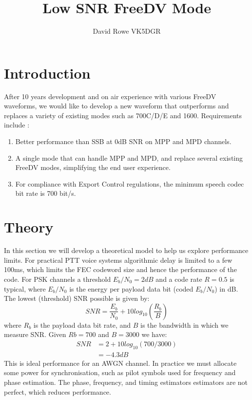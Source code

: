 \documentclass{article}
\begin{document}
\title{Low SNR FreeDV Mode}
\author{David Rowe VK5DGR}
\maketitle

\section{Introduction}

After 10 years development and on air experience with various FreeDV waveforms, we would like to develop a new waveform that outperforms and replaces a variety of existing modes such as 700C/D/E and 1600.  Requirements include \cite{freedv-020}:
\begin{enumerate}
\item Better performance than SSB at 0dB SNR on MPP and MPD channels.
\item A single mode that can handle MPP and MPD, and replace several existing FreeDV modes, simplifying the end user experience.
\item For compliance with Export Control regulations, the minimum speech codec bit rate is 700 bit/s.
\end{enumerate}

\section{Theory}

In this section we will develop a theoretical model to help us explore performance limits.  For practical PTT voice systems algorithmic delay is limited to a few 100ms, which limits the FEC codeword size and hence the performance of the code.  For PSK channels a threshold $E_b/N_0=2dB$ and a code rate $R=0.5$ is typical, where $E_b/N_0$ is the energy per payload data bit (coded $E_b/N_0$) in dB.  The lowest (threshold) SNR possible is given by:
\begin{equation}
SNR = \frac{E_b}{N_0} + 10log_{10}\left(\frac{R_b}{B}\right)
\end{equation}
where $R_b$ is the payload data bit rate, and $B$ is the bandwidth in which we measure SNR.  Given $Rb=700$ and $B=3000$ we have:
\begin{equation}
\begin{split}
SNR &= 2 + 10log_{10}(700/3000) \\
    &= -4.3 dB
\end{split}
\end{equation}
This is ideal performance for an AWGN channel.  In practice we must allocate some power for synchronisation, such as pilot symbols used for frequency and phase estimation.  The phase, frequency, and timing estimators estimators are not perfect, which reduces performance.
\end{document}
